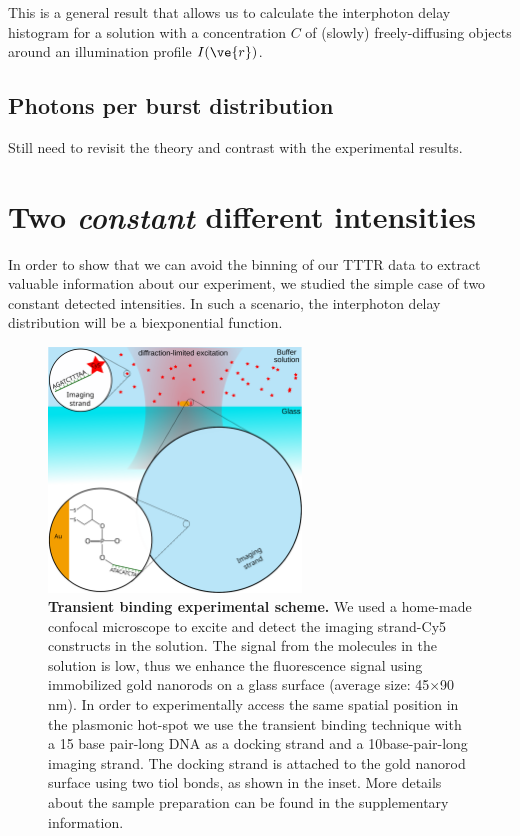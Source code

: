This is a general result that allows us to calculate the interphoton 
delay histogram  for a solution with a concentration $C$ of (slowly) 
freely-diffusing objects around an illumination profile $I(\ve{r})$. 

\subsection{Photons per burst distribution}

Still need to revisit the theory and contrast with the experimental results.

\section{Two \textit{constant} different intensities}

In order to show that we can avoid the binning of our TTTR data to 
extract valuable information about our experiment, we studied the 
simple case of two constant detected intensities. In such a scenario, 
the interphoton delay distribution will be a biexponential function.

\begin{figure}
\centering
\includegraphics[width=0.6\textwidth]{Transient_scheme}%
\caption{\textbf{Transient binding experimental scheme.} We used a 
home-made confocal microscope to excite and detect the imaging 
strand-Cy5 constructs in the solution. The signal from the molecules 
in the solution is low, thus we enhance the fluorescence signal using 
immobilized gold nanorods on a glass surface (average size: 45$\times$90 nm). 
In order to experimentally access the same spatial position in the plasmonic 
hot-spot we use the transient binding technique with a 15 base pair-long 
DNA as a docking strand and a 10base-pair-long imaging strand. 
The docking strand is attached to the gold nanorod surface using 
two tiol bonds, as shown in the inset. More details about the sample 
preparation can be found in the supplementary information. 
\label{fg:transient}}
\end{figure}

